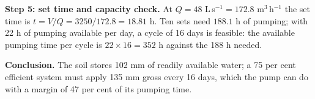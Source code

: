 \textbf{Step 5: set time and capacity check.} At $Q=48$ L\,s$^{-1}=172.8$ m$^3$\,h$^{-1}$ the set time is $t=V/Q=3250/172.8=18.81$ h. Ten sets need $188.1$ h of pumping; with 22 h of pumping available per day, a cycle of 16 days is feasible: the available pumping time per cycle is $22\times16=352$ h against the 188 h needed.

\textbf{Conclusion.} The soil stores 102 mm of readily available water; a 75 per cent efficient system must apply 135 mm gross every 16 days, which the pump can do with a margin of 47 per cent of its pumping time.

